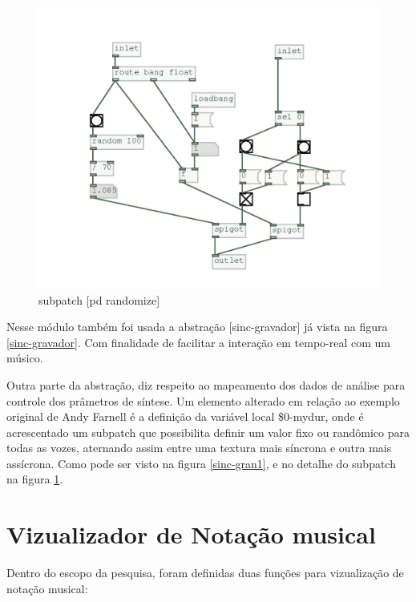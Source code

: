 \documentclass{ppgmus}
\begin{document}
\begin{figure}[-h]
\includegraphics[scale=.6]{sub-randomize}
\caption{subpatch [pd randomize]}
\label{sub-randomize}
\end{figure}


Nesse módulo também foi usada a abstração [sinc-gravador] já vista na figura \ref{sinc-gravador}.
Com finalidade de facilitar a interação em tempo-real com um músico.

Outra parte da abstração, diz respeito ao mapeamento dos dados de análise para controle
dos prâmetros de síntese. Um elemento alterado em relação ao exemplo original de Andy
Farnell é a definição da variável local \$0-mydur, onde é acrescentado um subpatch que 
possibilita definir um valor fixo ou randômico para todas as vozes, aternando assim entre
uma textura mais síncrona e outra mais assícrona. Como pode ser visto na figura \ref{sinc-gran1},
e no detalhe do subpatch na figura \ref{sub-randomize}.


\pagebreak





\section{Vizualizador de Notação musical}
\label{sec-notacao}



Dentro do escopo da pesquisa, foram definidas duas funções
para vizualização de notação musical:
\end{document}
